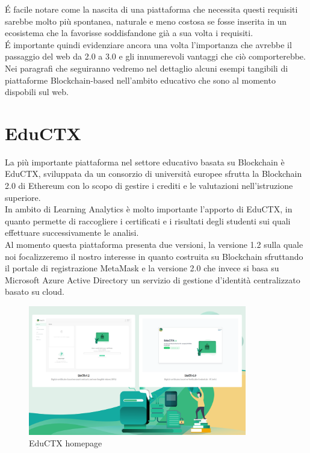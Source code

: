 \vspace{1em}
\'E facile notare come la nascita di una piattaforma che necessita questi requisiti sarebbe molto più spontanea, naturale e meno costosa se 
fosse inserita in un ecosistema che la favorisse soddisfandone già a sua volta i requisiti.
\\\'E importante quindi evidenziare ancora una volta l'importanza che avrebbe il passaggio del web da 2.0 a 3.0 e gli innumerevoli vantaggi che ciò comporterebbe.
\\Nei paragrafi che seguiranno vedremo nel dettaglio alcuni esempi tangibili di piattaforme Blockchain-based nell'ambito educativo che sono al momento dispobili sul web.

\newpage
\section{EduCTX}
La più importante piattaforma nel settore educativo basata su Blockchain è EduCTX, sviluppata da un consorzio di università europee sfrutta la Blockchain 2.0 di Ethereum con lo scopo di gestire i crediti e le valutazioni nell'istruzione superiore.
\\In ambito di Learning Analytics è molto importante l'apporto di EduCTX, in quanto permette di raccogliere i certificati e i risultati degli studenti sui quali effettuare successivamente le analisi.
\\Al momento questa piattaforma presenta due versioni, la versione 1.2 sulla quale noi focalizzeremo il nostro interesse in quanto costruita su Blockchain
sfruttando il portale di registrazione MetaMask e la versione 2.0 che invece si basa su Microsoft Azure Active Directory un servizio di gestione d'identità centralizzato basato su cloud.
\begin{figure}[h]
    \centering
    \includegraphics[width=0.85\textwidth]{Immagini/EduCTX.PNG}
    \caption{EduCTX homepage}
\end{figure}

